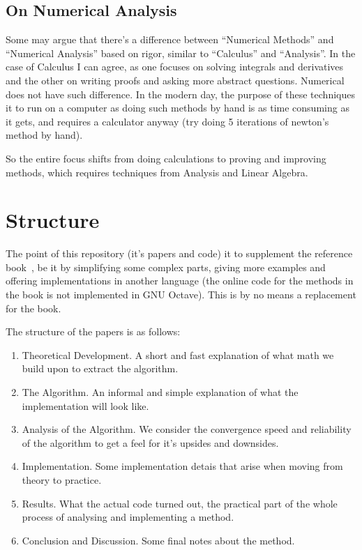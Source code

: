 \documentclass[12pt]{article}
\theoremstyle{remark}
\begin{document}
\subsection{On Numerical Analysis}\label{sec:further-explanation}

Some may argue that there's a difference between ``Numerical Methods'' and ``Numerical Analysis'' based on rigor, similar to ``Calculus'' and ``Analysis''. In the case of Calculus I can agree, as one focuses on solving integrals and derivatives and the other on writing proofs and asking more abstract questions. Numerical does not have such difference. In the modern day, the purpose of these techniques it to run on a computer as doing such methods by hand is as time consuming as it gets, and requires a calculator anyway (try doing 5 iterations of newton's method by hand).

So the entire focus shifts from doing calculations to proving and improving methods, which requires techniques from Analysis and Linear Algebra.

\section{Structure}\label{sec:intro}

The point of this repository (it's papers and code) it to supplement the reference book~\cite{book}, be it by simplifying some complex parts, giving more examples and offering implementations in another language (the online code for the methods in the book is not implemented in GNU Octave). This is by no means a replacement for the book.

The structure of the papers is as follows:
\begin{enumerate}
  \item Theoretical Development. A short and fast explanation of what math we build upon to extract the algorithm.
  \item The Algorithm. An informal and simple explanation of what the implementation   will look like.
  \item Analysis of the Algorithm. We consider the convergence speed and reliability of the algorithm to get a feel for it's upsides and downsides.
  \item Implementation. Some implementation detais that arise when moving from theory to practice.
  \item Results. What the actual code turned out, the practical part of the whole process of analysing and implementing a method.
  \item Conclusion and Discussion. Some final notes about the method.
\end{enumerate}



\end{document}
